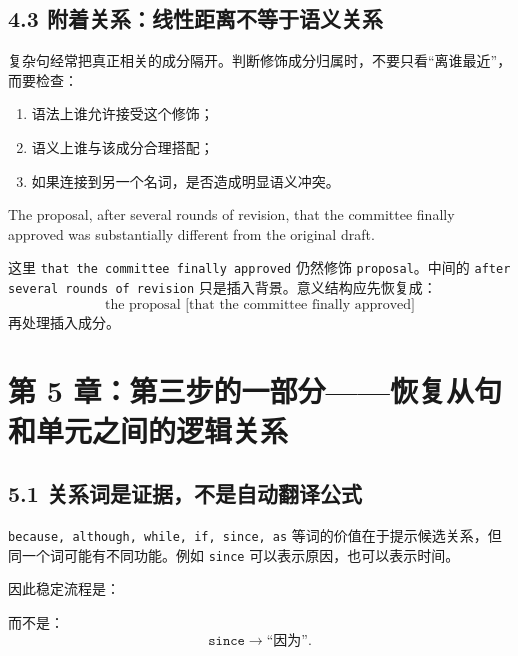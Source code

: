 \documentclass[11pt,a4paper]{ctexart}
\begin{document}
\subsection{4.3 附着关系：线性距离不等于语义关系}
复杂句经常把真正相关的成分隔开。判断修饰成分归属时，不要只看“离谁最近”，而要检查：
\begin{enumerate}
  \item 语法上谁允许接受这个修饰；
  \item 语义上谁与该成分合理搭配；
  \item 如果连接到另一个名词，是否造成明显语义冲突。
\end{enumerate}

\begin{eng}[例 11：插入语造成隔离]
The proposal, after several rounds of revision, that the committee finally approved was substantially different from the original draft.
\end{eng}
这里 \texttt{that the committee finally approved} 仍然修饰 \texttt{proposal}。中间的 \texttt{after several rounds of revision} 只是插入背景。意义结构应先恢复成：
\[
\text{the proposal [that the committee finally approved]}
\]
再处理插入成分。

\section{第 5 章：第三步的一部分——恢复从句和单元之间的逻辑关系}

\subsection{5.1 关系词是证据，不是自动翻译公式}
\texttt{because, although, while, if, since, as} 等词的价值在于提示候选关系，但同一个词可能有不同功能。例如 \texttt{since} 可以表示原因，也可以表示时间。

因此稳定流程是：
\begin{center}
\end{center}
而不是：
\[
\texttt{since} \rightarrow \text{“因为”}.
\]
\end{document}
